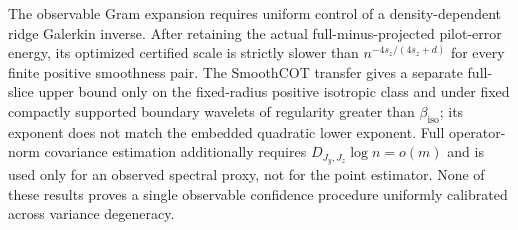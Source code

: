 The observable Gram expansion requires uniform control of a density-dependent ridge Galerkin inverse. After retaining the actual full-minus-projected pilot-error energy, its optimized certified scale is strictly slower than \(n^{-4s_z/(4s_z+d)}\) for every finite positive smoothness pair. The SmoothCOT transfer gives a separate full-slice upper bound only on the fixed-radius positive isotropic class and under fixed compactly supported boundary wavelets of regularity greater than \(\beta_{\mathrm{iso}}\); its exponent does not match the embedded quadratic lower exponent. Full operator-norm covariance estimation additionally requires \(D_{J_y,J_z}\log n=o(m)\) and is used only for an observed spectral proxy, not for the point estimator. None of these results proves a single observable confidence procedure uniformly calibrated across variance degeneracy.